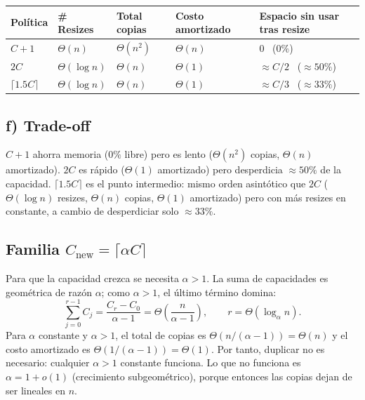 \documentclass[11pt,a4paper]{article}
\begin{document}
\renewcommand{\arraystretch}{1.4}
{\setlength{\tabcolsep}{4pt}
\begin{tabular}{@{}L{1.7cm}L{2.1cm}L{2cm}L{2.4cm}L{2.8cm}@{}}
\toprule
Política & \# Resizes & Total copias & Costo amortizado & Espacio sin usar tras resize \\
\midrule
$C+1$              & $\Theta(n)$      & $\Theta(n^2)$ & $\Theta(n)$ & $0$ \ ($0\%$) \\
$2C$               & $\Theta(\log n)$ & $\Theta(n)$   & $\Theta(1)$ & $\approx C/2$ \ ($\approx 50\%$) \\
$\lceil 1.5C\rceil$ & $\Theta(\log n)$ & $\Theta(n)$   & $\Theta(1)$ & $\approx C/3$ \ ($\approx 33\%$) \\
\bottomrule
\end{tabular}}
\renewcommand{\arraystretch}{1}

\subsection*{f) Trade-off}

$C+1$ ahorra memoria ($0\%$ libre) pero es lento ($\Theta(n^2)$ copias, $\Theta(n)$ amortizado). $2C$ es rápido ($\Theta(1)$ amortizado) pero desperdicia $\approx 50\%$ de la capacidad. $\lceil 1.5C\rceil$ es el punto intermedio: mismo orden asintótico que $2C$ ($\Theta(\log n)$ resizes, $\Theta(n)$ copias, $\Theta(1)$ amortizado) pero con más resizes en constante, a cambio de desperdiciar solo $\approx 33\%$.

\subsection*{Familia $C_{\text{new}} = \lceil \alpha C \rceil$}

Para que la capacidad crezca se necesita $\alpha > 1$. La suma de capacidades es geométrica de razón $\alpha$; como $\alpha > 1$, el último término domina:
\[
\sum_{j=0}^{r-1} C_j = \frac{C_r - C_0}{\alpha - 1} = \Theta\!\left(\frac{n}{\alpha - 1}\right),
\qquad r = \Theta(\log_\alpha n).
\]
Para $\alpha$ constante y $\alpha > 1$, el total de copias es $\Theta(n/(\alpha-1)) = \Theta(n)$ y el costo amortizado es $\Theta(1/(\alpha-1)) = \Theta(1)$. Por tanto, duplicar no es necesario: cualquier $\alpha > 1$ constante funciona. Lo que no funciona es $\alpha = 1 + o(1)$ (crecimiento subgeométrico), porque entonces las copias dejan de ser lineales en $n$.
\end{document}
